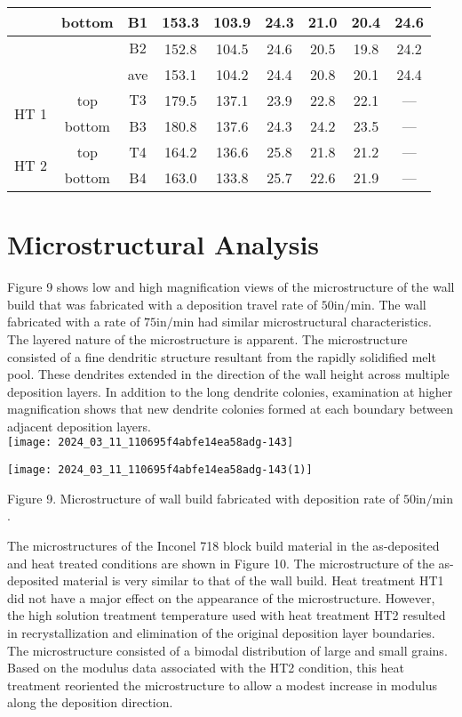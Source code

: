 \documentclass[10pt]{article}
\begin{document}
\begin{center}
\begin{tabular}{|c|c|c|c|c|c|c|c|c|}
\hline
 & \multirow{3}{*}{bottom} & B1 & 153.3 & 103.9 & 24.3 & 21.0 & 20.4 & 24.6 \\
\hline
 &  & $\mathrm{B} 2$ & 152.8 & 104.5 & 24.6 & 20.5 & 19.8 & 24.2 \\
\hline
 &  & ave & 153.1 & 104.2 & 24.4 & 20.8 & 20.1 & 24.4 \\
\hline
\multirow[t]{2}{*}{HT 1} & top & $\mathrm{T} 3$ & 179.5 & 137.1 & 23.9 & 22.8 & 22.1 & --- \\
\hline
 & bottom & B3 & 180.8 & 137.6 & 24.3 & 24.2 & 23.5 & --- \\
\hline
\multirow[t]{2}{*}{HT 2} & top & T4 & 164.2 & 136.6 & 25.8 & 21.8 & 21.2 & --- \\
\hline
 & bottom & B4 & 163.0 & 133.8 & 25.7 & 22.6 & 21.9 & --- \\
\hline
\end{tabular}
\end{center}

\section*{Microstructural Analysis}
Figure 9 shows low and high magnification views of the microstructure of the wall build that was fabricated with a deposition travel rate of $50 \mathrm{in} / \mathrm{min}$. The wall fabricated with a rate of $75 \mathrm{in} / \mathrm{min}$ had similar microstructural characteristics. The layered nature of the microstructure is apparent. The microstructure consisted of a fine dendritic structure resultant from the rapidly solidified melt pool. These dendrites extended in the direction of the wall height across multiple deposition layers. In addition to the long dendrite colonies, examination at higher magnification shows that new dendrite colonies formed at each boundary between adjacent deposition layers.\\
\texttt{[image: 2024\_03\_11\_110695f4abfe14ea58adg-143]}

\begin{center}
\texttt{[image: 2024\_03\_11\_110695f4abfe14ea58adg-143(1)]}
\end{center}

Figure 9. Microstructure of wall build fabricated with deposition rate of $50 \mathrm{in} / \mathrm{min}$.

The microstructures of the Inconel 718 block build material in the as-deposited and heat treated conditions are shown in Figure 10. The microstructure of the as-deposited material is very similar to that of the wall build. Heat treatment HT1 did not have a major effect on the appearance of the microstructure. However, the high solution treatment temperature used with heat treatment HT2 resulted in recrystallization and elimination of the original deposition layer boundaries. The microstructure consisted of a bimodal distribution of large and small grains. Based on the modulus data associated with the HT2 condition, this heat treatment reoriented the microstructure to allow a modest increase in modulus along the deposition direction.
\end{document}

